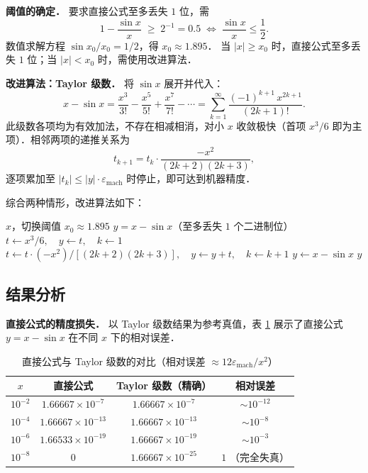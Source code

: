 \documentclass[UTF8,a4paper,11pt]{article}
\newcommand\e{\leftarrow}
\begin{document}
\noindent\textbf{阈值的确定．}
要求直接公式至多丢失 $1$ 位，需
$$1 - \frac{\sin x}{x} \;\ge\; 2^{-1} = 0.5 \;\Longleftrightarrow\; \frac{\sin x}{x} \le \frac{1}{2}.$$
数值求解方程 $\sin x_0 / x_0 = 1/2$，得 $x_0 \approx 1.895$．
当 $|x| \ge x_0$ 时，直接公式至多丢失 $1$ 位；当 $|x| < x_0$ 时，需使用改进算法．

\noindent\textbf{改进算法：Taylor 级数．}
将 $\sin x$ 展开并代入：
$$x - \sin x = \frac{x^3}{3!} - \frac{x^5}{5!} + \frac{x^7}{7!} - \cdots
= \sum_{k=1}^{\infty} \frac{(-1)^{k+1}\, x^{2k+1}}{(2k+1)!}.$$
此级数各项均为有效加法，不存在相减相消，对小 $x$ 收敛极快（首项 $x^3/6$ 即为主项）．相邻两项的递推关系为
$$t_{k+1} = t_k \cdot \frac{-x^2}{(2k+2)(2k+3)},$$
逐项累加至 $|t_k| \le |y|\cdot\varepsilon_{\mathrm{mach}}$ 时停止，即可达到机器精度．

综合两种情形，改进算法如下：

\begin{algorithm}[H]
    \caption{无相减相消地计算 $y = x - \sin x$}
    \begin{algorithmic}[1]
        \Require $x$，切换阈值 $x_0 \approx 1.895$
        \Ensure $y = x - \sin x$（至多丢失 $1$ 个二进制位）
            \State $t \e x^3 / 6,\quad y \e t,\quad k \e 1$
                \State $t \e t \cdot (-x^2) / [(2k{+}2)(2k{+}3)],\quad y \e y + t,\quad k \e k{+}1$
            \EndWhile
        \Else
            \State $y \e x - \sin x$ 
        \EndIf
        \State \Return $y$
    \end{algorithmic}
\end{algorithm}

\subsection{结果分析}

\noindent\textbf{直接公式的精度损失．}
以 Taylor 级数结果为参考真值，表 \ref{tab:p2} 展示了直接公式 $y = x - \sin x$ 在不同 $x$ 下的相对误差．

\begin{table}[H]
\centering
\caption{直接公式与 Taylor 级数的对比（相对误差 $\approx 12\varepsilon_{\mathrm{mach}}/x^2$）}
\label{tab:p2}
\small
\begin{tabular}{cccc}
\toprule
$x$ & 直接公式 & Taylor 级数（精确） & 相对误差 \\
\midrule
$10^{-2}$ & $1.66667\times10^{-7}$ & $1.66667\times10^{-7}$ & $\sim 10^{-12}$ \\
$10^{-4}$ & $1.66667\times10^{-13}$ & $1.66667\times10^{-13}$ & $\sim 10^{-8}$ \\
$10^{-6}$ & $1.66533\times10^{-19}$ & $1.66667\times10^{-19}$ & $\sim 10^{-3}$ \\
$10^{-8}$ & $0$ & $1.66667\times10^{-25}$ & $1$ （完全失真）\\
\bottomrule
\end{tabular}
\end{table}
\end{document}
